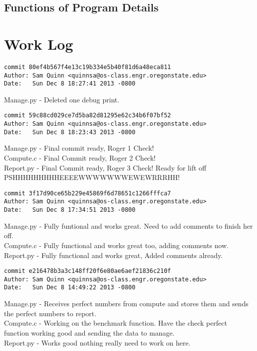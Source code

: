 \documentclass[letterpaper,10pt,notitlepage,fleqn]{article}
\begin{document}
\subsection*{Functions of Program Details}
 
\section*{Work Log}
\begin{verbatim}
commit 80ef4b567f4e13c19b334e5b40f81d6a48eca811
Author: Sam Quinn <quinnsa@os-class.engr.oregonstate.edu>
Date:   Sun Dec 8 18:27:41 2013 -0800
\end{verbatim}
    Manage.py - Deleted one debug print.
    
\begin{verbatim}
commit 59c88cd029ce7d5ba82d81295e62c34b6f07bf52
Author: Sam Quinn <quinnsa@os-class.engr.oregonstate.edu>
Date:   Sun Dec 8 18:23:43 2013 -0800
\end{verbatim}
    Manage.py - Final commit ready, Roger 1 Check!\\
    Compute.c - Final Commit ready, Roger 2 Check!\\
    Report.py - Final Commit ready, Roger 3 Check! Ready for lift off PSHHHHHHHHHEEEEWWWWWWWEWEWRRRHH!
\begin{verbatim}
commit 3f17d90ce65b229e45869f6d78651c1266fffca7
Author: Sam Quinn <quinnsa@os-class.engr.oregonstate.edu>
Date:   Sun Dec 8 17:34:51 2013 -0800
\end{verbatim}
    Manage.py - Fully funtional and works great. Need to add comments to finish her off.\\
    Compute.c - Fully functional and works great too, adding comments now.\\
    Report.py - Fully functional and works great, Added comments already.\\
\begin{verbatim}
commit e216478b3a3c148ff20f6e80ae6aef21836c210f
Author: Sam Quinn <quinnsa@os-class.engr.oregonstate.edu>
Date:   Sun Dec 8 14:49:22 2013 -0800
\end{verbatim}
    Manage.py - Receives perfect numbers from compute and stores them and sends the perfect numbers to report.\\
    Compute.c - Working on the benchmark function. Have the check perfect function working good and sending the data to manage.\\
    Report.py - Works good nothing really need to work on here.\\
\end{document}
